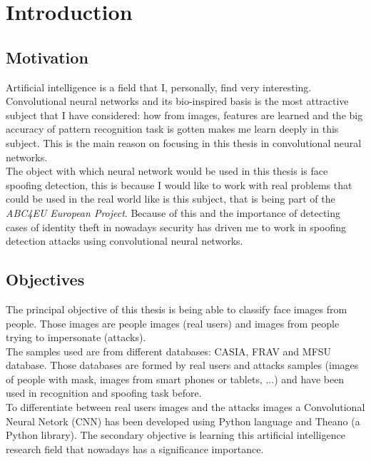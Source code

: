 \chapter{Introduction}\label{ch:introduction}

\section{Motivation}
Artificial intelligence is a field that I, personally, find very interesting. Convolutional neural networks and its bio-inspired basis is the most attractive subject that I have considered: how from images, features are learned and the big accuracy of pattern recognition task is gotten makes me learn deeply in this subject. This is the main reason on focusing in this thesis in convolutional neural networks.\\

The object with which neural network would be used in this thesis is face spoofing detection, this is because I would like to work with real problems that could be used in the real world like is this subject, that is being part of the \textit{ABC4EU European Project}. Because of this and the importance of detecting cases of identity theft in nowadays security has driven me to work in spoofing detection attacks using convolutional neural networks.

\section{Objectives}
The principal objective of this thesis is being able to classify face images from people. Those images are people images (real users) and images from people trying to impersonate (attacks).\\

The samples used are from different databases: CASIA, FRAV and MFSU database. Those databases are formed by real users and attacks samples (images of people with mask, images from smart phones or tablets, ...) and have been used in recognition and spoofing task before.\\

To differentiate between real users images and the attacks images a Convolutional Neural Netork (CNN) has been developed using Python language and Theano (a Python library). The secondary objective is learning this artificial intelligence research field that nowadays has a significance importance.\\

